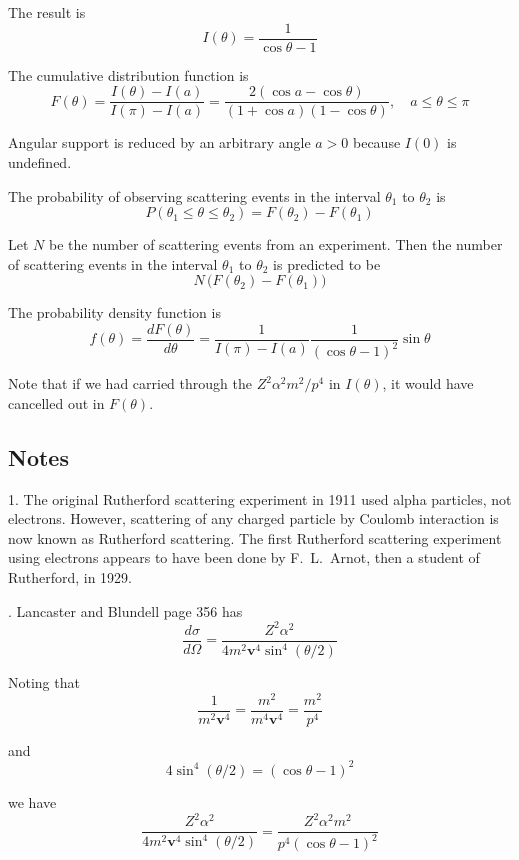\documentclass[12pt]{article}
\begin{document}
The result is
\begin{equation*}
I(\theta)=\frac{1}{\cos\theta-1}
\end{equation*}

The cumulative distribution function is
\begin{equation*}
F(\theta)=\frac{I(\theta)-I(a)}{I(\pi)-I(a)}
=\frac{2(\cos a-\cos\theta)}{(1+\cos a)(1-\cos\theta)},
\quad
a\le\theta\le\pi
\end{equation*}

Angular support is reduced by an arbitrary angle $a>0$ because $I(0)$ is undefined.

\bigskip
The probability of observing scattering events
in the interval $\theta_1$ to $\theta_2$ is
\begin{equation*}
P(\theta_1\le\theta\le\theta_2)=F(\theta_2)-F(\theta_1)
\end{equation*}

Let $N$ be the number of scattering events from an experiment.
Then the number of scattering events in the interval $\theta_1$ to $\theta_2$ is predicted to be
$$
N\,\big(F(\theta_2)-F(\theta_1)\big)
$$

The probability density function is
$$
f(\theta)=\frac{dF(\theta)}{d\theta}=\frac{1}{I(\pi)-I(a)}\frac{1}{(\cos\theta-1)^2}\sin\theta
$$

Note that if we had carried through the $Z^2\alpha^2m^2/p^4$ in $I(\theta)$,
it would have cancelled out in $F(\theta)$.

\subsection*{Notes}
1. The original Rutherford scattering experiment in 1911 used alpha particles, not electrons.
However, scattering of any charged particle by Coulomb interaction
is now known as Rutherford scattering.
The first Rutherford scattering experiment using electrons appears to have
been done by F.~L.~Arnot, then a student of Rutherford, in 1929.

. Lancaster and Blundell page 356 has
\begin{equation*}
\frac{d\sigma}{d\Omega}
=\frac{Z^2\alpha^2}{4m^2\mathbf v^4\sin^4(\theta/2)}
\end{equation*}

Noting that
\begin{equation*}
\frac{1}{m^2\mathbf v^4}=\frac{m^2}{m^4\mathbf v^4}=\frac{m^2}{p^4}
\end{equation*}

and
\begin{equation*}
4\sin^4(\theta/2)=(\cos\theta-1)^2
\end{equation*}

we have
\begin{equation*}
\frac{Z^2\alpha^2}{4m^2\mathbf v^4\sin^4(\theta/2)}
=\frac{Z^2\alpha^2m^2}{p^4(\cos\theta-1)^2}
\end{equation*}
\end{document}
